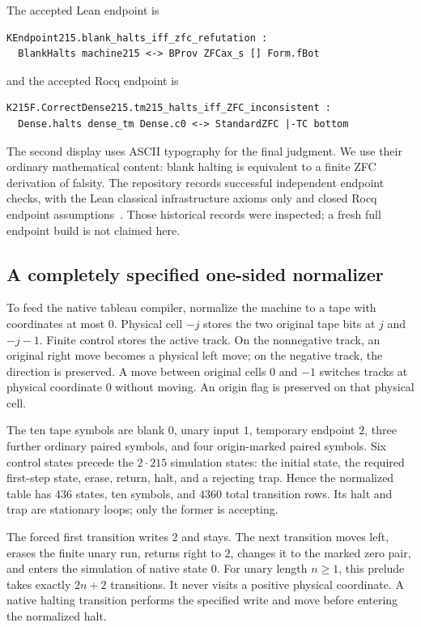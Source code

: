 \documentclass[11pt]{article}
\theoremstyle{remark}\newtheorem{remark}[theorem]{Remark}
\begin{document}
The accepted Lean endpoint is
\begin{lstlisting}
KEndpoint215.blank_halts_iff_zfc_refutation :
  BlankHalts machine215 <-> BProv ZFCax_s [] Form.fBot
\end{lstlisting}
and the accepted Rocq endpoint is
\begin{lstlisting}
K215F.CorrectDense215.tm215_halts_iff_ZFC_inconsistent :
  Dense.halts dense_tm Dense.c0 <-> StandardZFC |-TC bottom
\end{lstlisting}
The second display uses ASCII typography for the final judgment. We use their ordinary mathematical content: blank halting is equivalent to a finite ZFC derivation of falsity. The repository records successful independent endpoint checks, with the Lean classical infrastructure axioms only and closed Rocq endpoint assumptions~\cite{K215Verification,K215Candidate}. Those historical records were inspected; a fresh full endpoint build is not claimed here.

\subsection{A completely specified one-sided normalizer}

To feed the native tableau compiler, normalize the machine to a tape with coordinates at most $0$. Physical cell $-j$ stores the two original tape bits at $j$ and $-j-1$. Finite control stores the active track. On the nonnegative track, an original right move becomes a physical left move; on the negative track, the direction is preserved. A move between original cells $0$ and $-1$ switches tracks at physical coordinate $0$ without moving. An origin flag is preserved on that physical cell.

The ten tape symbols are blank $0$, unary input $1$, temporary endpoint $2$, three further ordinary paired symbols, and four origin-marked paired symbols. Six control states precede the $2\cdot215$ simulation states: the initial state, the required first-step state, erase, return, halt, and a rejecting trap. Hence the normalized table has $436$ states, ten symbols, and $4360$ total transition rows. Its halt and trap are stationary loops; only the former is accepting.

The forced first transition writes $2$ and stays. The next transition moves left, erases the finite unary run, returns right to $2$, changes it to the marked zero pair, and enters the simulation of native state $0$. For unary length $n\ge1$, this prelude takes exactly $2n+2$ transitions. It never visits a positive physical coordinate. A native halting transition performs the specified write and move before entering the normalized halt.
\end{document}
